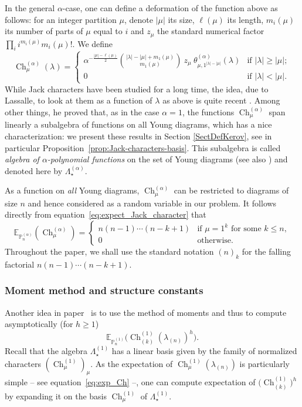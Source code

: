 \documentclass[11pt]{amsart}
\theoremstyle{plain}
\theoremstyle{remark}
\newcommand{\PP}{\mathbb{P}}
\newcommand{\Pola}{\Lambda_\star^{(\alpha)}}
\newcommand{\Polun}{\Lambda_\star^{(1)}}
\newcommand{\esper}{\mathbb{E}}
\DeclareMathOperator{\Ch}{Ch}
\begin{document}
In the general $\alpha$-case, one can define a deformation of the function above as follows:
for an integer partition $\mu$, denote $|\mu|$ its size, $\ell(\mu)$
its length, $m_i(\mu)$ its number of parts of $\mu$ equal to $i$
and $z_\mu$ the standard numerical factor $\prod_i i^{m_i(\mu)} m_i(\mu)!$.
We define
\begin{displaymath}
\label{eq:definition-Jack}
\Ch_{\mu}^{(\alpha)}(\lambda)=
\begin{cases}
\alpha^{-\frac{|\mu|-\ell(\mu)}{2}}
\binom{|\lambda|-|\mu|+m_1(\mu)}{m_1(\mu)}
\ z_\mu \ \theta^{(\alpha)}_{\mu,1^{|\lambda|-|\mu|}}(\lambda)
&\text{if }|\lambda| \ge |\mu| ;\\
0 & \text{if }|\lambda| < |\mu|.
\end{cases}
\end{displaymath}
While Jack characters have been studied for a long time,
the idea, due to Lassalle, to look at them as a function of $\lambda$ as above
is quite recent \cite{Lassalle2008a,Lassalle2009}.
Among other things, he proved that, as in the case $\alpha=1$,
the functions $\Ch_{\mu}^{(\alpha)}$ span linearly a subalgebra
of functions on all Young diagrams,
which has a nice characterization:
we present these results in Section \ref{SectDefKerov},
see in particular Proposition~\ref{prop:Jack-characters-basis}.
This subalgebra is called \emph{algebra of
$\alpha$-polynomial functions} on the set of Young diagrams (see also \cite{KerovOlshanskiPolFunc})
and denoted here by $\Pola$.

As a function on {\em all} Young diagrams,
$\Ch^{(\alpha)}_\mu$ can be restricted to diagrams of size $n$
and hence considered as a random variable in our problem.
It follows directly from equation~\eqref{eq:expect_Jack_character} that
\begin{equation}\label{eq:exp_Ch}
    \esper_{\PP_n^{(\alpha)}}(\Ch^{(\alpha)}_\mu)=\begin{cases}
    n(n-1)\cdots(n-k+1) & \text{if }\mu=1^k \text{ for some }k \leq n,\\
    0   & \text{otherwise.}
\end{cases}
\end{equation}
Throughout the paper, we shall use the standard notation
$(n)_k$ for the falling factorial $n(n-1)\cdots(n-k+1)$. 


\subsubsection{Moment method and structure constants}
Another idea in paper~\cite{IvanovOlshanski2002} is to use the method of moments 
and thus to compute asymptotically (for $h \ge 1$)
\[\esper_{\PP_n^{(1)}} \big( \Ch^{(1)}_{(k)}(\lambda_{(n)})^h \big). \]
Recall that the algebra $\Polun$ has a linear basis given by the family of normalized characters $\left(\Ch^{(1)}_\mu\right)_\mu$.
As the expectation of $\Ch_{\mu}^{(1)}(\lambda_{(n)})$ is particularly simple
-- see equation~\eqref{eq:exp_Ch} --, one can compute expectation of $\big(\Ch^{(1)}_{(k)}\big)^h$ by expanding it on the basis $\Ch_{\mu}^{(1)}$ of $\Polun$.
\end{document}

